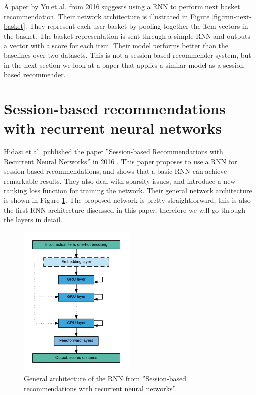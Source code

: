 A paper by Yu et al. from 2016 \cite{Yu:2016:DRM:2911451.2914683} suggests using a RNN to perform next basket recommendation. Their network architecture is illustrated in Figure \ref{fig:rnn-next-basket}. They represent each user basket by pooling together the item vectors in the basket. The basket representation is sent through a simple RNN and outputs a vector with a score for each item. Their model performs better than the baselines over two datasets. This is not a session-based recommender system, but in the next section we look at a paper that applies a similar model as a session-based recommender.


\section{Session-based recommendations with recurrent neural networks}
\label{sec:hidasi-sess-based-rnn}
Hidasi et al. published the paper ''Session-based Recommendations with Recurrent Neural Networks'' in 2016 \cite{DBLP:journals/corr/HidasiKBT15}. This paper proposes to use a RNN for session-based recommendations, and shows that a basic RNN can achieve remarkable results. They also deal with sparsity issues, and introduce a new ranking loss function for training the network. Their general network architecture is shown in Figure \ref{fig:gru4rec-network}. The proposed network is pretty straightforward, this is also the first RNN architecture discussed in this paper, therefore we will go through the layers in detail.

\begin{figure}[htp]
	\centering
	\includegraphics[width=0.5\textwidth]{fig/gru4rec-network.png}
	\caption{General architecture of the RNN from ''Session-based recommendations with recurrent neural networks''. \cite{DBLP:journals/corr/HidasiKBT15}}
	\label{fig:gru4rec-network}
\end{figure}

